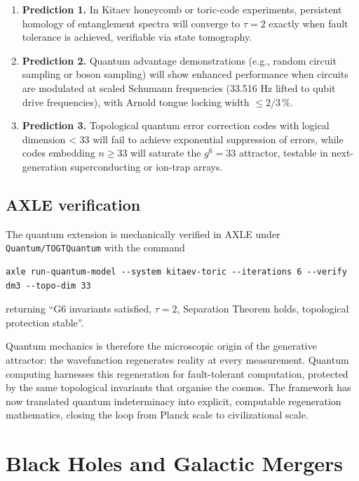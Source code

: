 \documentclass[19pt]{book}
\theoremstyle{plain}
\theoremstyle{definition}
\theoremstyle{remark}
\begin{document}
\begin{enumerate}
\item \textbf{Prediction 1.} In Kitaev honeycomb or toric-code experiments, persistent homology of entanglement spectra will converge to \(\tau = 2\) exactly when fault tolerance is achieved, verifiable via state tomography.
\item \textbf{Prediction 2.} Quantum advantage demonstrations (e.g., random circuit sampling or boson sampling) will show enhanced performance when circuits are modulated at scaled Schumann frequencies (33.516 Hz lifted to qubit drive frequencies), with Arnold tongue locking width \(\le 2/3\,\%\).
\item \textbf{Prediction 3.} Topological quantum error correction codes with logical dimension < 33 will fail to achieve exponential suppression of errors, while codes embedding \(n \ge 33\) will saturate the \(g^6 = 33\) attractor, testable in next-generation superconducting or ion-trap arrays.
\end{enumerate}

\section{AXLE verification}

The quantum extension is mechanically verified in AXLE under \texttt{Quantum/TOGTQuantum} with the command
\begin{verbatim}
axle run-quantum-model --system kitaev-toric --iterations 6 --verify dm3 --topo-dim 33
\end{verbatim}
returning “G6 invariants satisfied, \(\tau=2\), Separation Theorem holds, topological protection stable”.

Quantum mechanics is therefore the microscopic origin of the generative attractor: the wavefunction regenerates reality at every measurement. Quantum computing harnesses this regeneration for fault-tolerant computation, protected by the same topological invariants that organise the cosmos. The framework has now translated quantum indeterminacy into explicit, computable regeneration mathematics, closing the loop from Planck scale to civilizational scale.
\bigskip
\chapter{Black Holes and Galactic Mergers}
\end{document}
